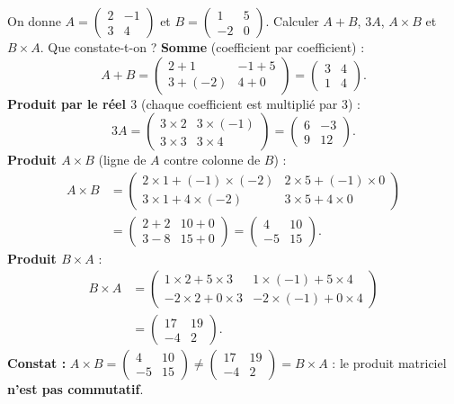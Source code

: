 \documentclass[11pt]{article}
\begin{document}
\begin{exoresolu}
On donne $A=\begin{pmatrix} 2 & -1 \\ 3 & 4 \end{pmatrix}$ et $B=\begin{pmatrix} 1 & 5 \\ -2 & 0 \end{pmatrix}$.
Calculer $A+B$, $3A$, $A\times B$ et $B\times A$. Que constate-t-on ?
\tcblower
\textbf{Somme} (coefficient par coefficient) :
\[ A+B=\begin{pmatrix} 2+1 & -1+5 \\ 3+(-2) & 4+0 \end{pmatrix}=\begin{pmatrix} 3 & 4 \\ 1 & 4 \end{pmatrix}. \]
\textbf{Produit par le réel $3$} (chaque coefficient est multiplié par $3$) :
\[ 3A=\begin{pmatrix} 3\times 2 & 3\times (-1) \\ 3\times 3 & 3\times 4 \end{pmatrix}=\begin{pmatrix} 6 & -3 \\ 9 & 12 \end{pmatrix}. \]
\textbf{Produit $A\times B$} (ligne de $A$ contre colonne de $B$) :
\begin{align*}
A\times B &=\begin{pmatrix} 2\times 1+(-1)\times(-2) & 2\times 5+(-1)\times 0 \\ 3\times 1+4\times(-2) & 3\times 5+4\times 0 \end{pmatrix}\\
&=\begin{pmatrix} 2+2 & 10+0 \\ 3-8 & 15+0 \end{pmatrix}=\begin{pmatrix} 4 & 10 \\ -5 & 15 \end{pmatrix}.
\end{align*}
\textbf{Produit $B\times A$} :
\begin{align*}
B\times A &=\begin{pmatrix} 1\times 2+5\times 3 & 1\times(-1)+5\times 4 \\ -2\times 2+0\times 3 & -2\times(-1)+0\times 4 \end{pmatrix}\\
&=\begin{pmatrix} 17 & 19 \\ -4 & 2 \end{pmatrix}.
\end{align*}
\textbf{Constat :} $A\times B=\begin{pmatrix} 4 & 10 \\ -5 & 15 \end{pmatrix}\neq\begin{pmatrix} 17 & 19 \\ -4 & 2 \end{pmatrix}=B\times A$ : le produit matriciel \textbf{n'est pas commutatif}.
\end{exoresolu}
\end{document}
